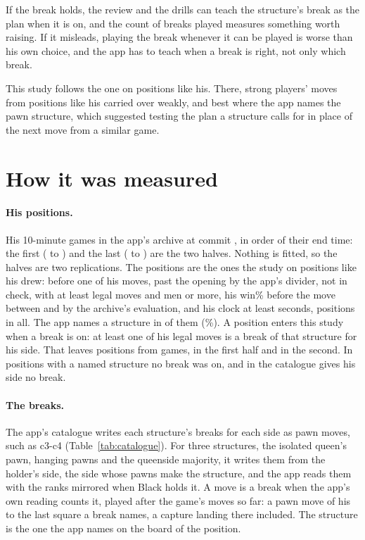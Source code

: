 \documentclass[11pt]{article}
\begin{document}
If the break holds, the review and the drills can teach the structure's break as the plan when it
is on, and the count of breaks played measures something worth raising. If it misleads, playing
the break whenever it can be played is worse than his own choice, and the app has to teach when a
break is right, not only which break.

This study follows the one on positions like his. There, strong players' moves from positions
like his carried over weakly, and best where the app names the pawn structure, which suggested
testing the plan a structure calls for in place of the next move from a similar game.

\section{How it was measured}

\paragraph{His positions.} His \Games{} 10-minute games in the app's archive at commit
\texttt{\AppCommit}, in order of their end time: the first \GamesFirst{} (\FirstFrom{} to
\FirstTo) and the last \GamesSecond{} (\SecondFrom{} to \SecondTo) are the two halves. Nothing is
fitted, so the halves are two replications. The positions are the ones the study on positions like
his drew: before one of his moves, past the opening by the app's divider, not in check, with at
least \MinLegal{} legal moves and \MinMen{} men or more, his win\% before the move between
\WinLow{} and \WinHigh{} by the archive's evaluation, and his clock at least \ClockFloor{} seconds,
\Candidates{} positions in all. The app names a structure in \Named{} of them (\NamedShare\%). A
position enters this study when a break is on: at least one of his legal moves is a break of that
structure for his side. That leaves \BreakOn{} positions from \BreakGames{} games, \BreakOnFirst{}
in the first half and \BreakOnSecond{} in the second. In \NotOn{} positions with a named
structure no break was on, and in \NoLever{} the catalogue gives his side no break.

\paragraph{The breaks.} The app's catalogue writes each structure's breaks for each side as pawn
moves, such as c3-c4 (Table~\ref{tab:catalogue}). For three structures, the isolated queen's
pawn, hanging pawns and the queenside majority, it writes them from the holder's side, the side
whose pawns make the structure, and the app reads them with the ranks mirrored when Black holds
it. A move is a break when the app's own reading counts it, played after the game's moves so far:
a pawn move of his to the last square a break names, a capture landing there included. The
structure is the one the app names on the board of the position.
\end{document}
